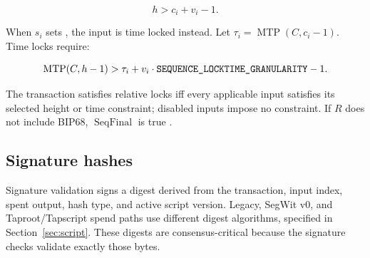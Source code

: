 \[
  h > c_i + v_i - 1.
\]

When \(s_i\) sets , the input is time
locked instead. Let \(\tau_i=\operatorname{MTP}(C,c_i-1)\). Time locks require:

\[
  \operatorname{MTP}(C,h-1) >
  \tau_i + v_i \cdot \text{\texttt{SEQUENCE\_LOCKTIME\_GRANULARITY}} - 1.
\]

The transaction satisfies relative locks iff every applicable input satisfies
its selected height or time constraint; disabled inputs impose no constraint.
If \(R\) does not include BIP68, \(\operatorname{SeqFinal}\) is true
\cite{bip-0068,bip-0112,bip-0113,bitcoin-core-v31}.

\subsection{Signature hashes}

Signature validation signs a digest derived from the transaction, input index,
spent output, hash type, and active script version. Legacy, SegWit v0, and
Taproot/Tapscript spend paths use different digest algorithms, specified in
Section~\ref{sec:script}. These digests are consensus-critical because the
signature checks validate exactly those bytes.
